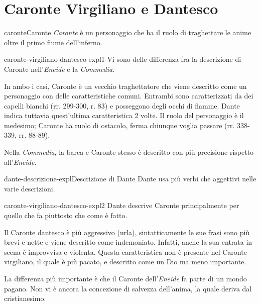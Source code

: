 \documentclass[preview]{standalone}
\begin{document}
\genpage

\section{Caronte Virgiliano e Dantesco}

\begin{snippetcharacter}{caronte}{Caronte}
    \textit{Caronte} è un personaggio che ha il ruolo di traghettare le anime
    oltre il primo fiume dell'inferno.
\end{snippetcharacter}

\begin{snippet}{caronte-virgiliano-dantesco-expl1}
    Vi sono delle differenza fra la descrizione di Caronte nell'\textit{Eneide}
    e la \textit{Commedia}.
    
    In ambo i casi, Caronte è un vecchio traghettatore che viene descritto come un personaggio con
    delle caratteristiche comuni.
    Entrambi sono caratterizzati da dei capelli bianchi (rr. 299-300, r. 83) e posseggono
    degli occhi di fiamme. Dante indica tuttavia quest'ultima caratteristica 2 volte.
    Il ruolo del personaggio è il medesimo; Caronte ha ruolo di ostacolo, ferma chiunque voglia passare
    (rr. 338-339, rr. 88-89).
    
    Nella \textit{Commedia}, la barca e Caronte stesso è descritto con più precisione
    rispetto all'\textit{Eneide}.
\end{snippet}

\begin{snippetnote}{dante-descrizione-expl}{Descrizione di Dante}
    Dante usa più verbi che aggettivi nelle varie descrizioni.
\end{snippetnote}

\begin{snippet}{caronte-virgiliano-dantesco-expl2}
    Dante descrive Caronte principalmente per quello che fa piuttosto che come è fatto.
    
    Il Caronte dantesco è più aggressivo (urla), sintatticamente le sue frasi sono
    più brevi e nette e viene descritto come indemoniato. Infatti, anche la sua entrata in scena
    è improvvisa e violenta. Questa caratteristica non è presente nel Caronte virgiliano,
    il quale è più pacato, e descritto come un Dio ma meno importante.
    
    La differenza più importante è che il Caronte dell'\textit{Eneide} fa parte di un mondo pagano.
    Non vi è ancora la concezione di salvezza dell'anima, la quale deriva dal cristianesimo.
\end{snippet}
\end{document}
